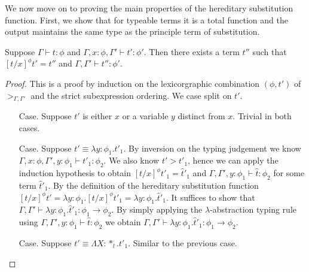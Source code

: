 We now move on to proving the main properties of the hereditary
substitution function.  First, we show that for typeable terms it is a
total function and the output maintains the same type as the principle
term of substitution.
\begin{lemma}
  \label{lemma:total_ssfp}
  Suppose $\Gamma \vdash t : \phi$ and $\Gamma, x:\phi, \Gamma' \vdash t':\phi'$. Then
  there exists a term $t''$ such that $[t/x]^\phi t' = t''$ and 
  $\Gamma,\Gamma' \vdash t'':\phi'$.
\end{lemma}
\begin{proof}
  This is a proof by induction on the lexicorgraphic combination $(\phi, t')$ of $>_{\Gamma,\Gamma'}$ and
the strict subexpression ordering.  We case split on $t'$.

\begin{itemize}
\item[Case.] Suppose $t'$ is either $x$ or a variable $y$ distinct from $x$.  
  Trivial in both cases.
  
\item[Case.] Suppose $t' \equiv \lambda y:\phi_1.t'_1$.  By inversion on the
  typing judgement we know $\Gamma,x:\phi,\Gamma',y:\phi_1 \vdash t'_1:\phi_2$.
  We also know $t' > t'_1$, hence we can apply the induction hypothesis to obtain
  $[t/x]^\phi t'_1 = \hat{t}'_1$ and $\Gamma,\Gamma',y:\phi_1 \vdash \hat{t}:\phi_2$
  for some term $\hat{t}'_1$.  By the definition of the hereditary substitution function 
  $[t/x]^\phi t' = \lambda y:\phi_1.[t/x]^\phi t'_1 = \lambda y:\phi_1.\hat{t}'_1$.  It suffices
  to show that $\Gamma,\Gamma' \vdash \lambda y:\phi_1.\hat{t}'_1:\phi_1 \to \phi_2$.  
  By simply applying the $\lambda$-abstraction typing rule using
  $\Gamma,\Gamma',y:\phi_1 \vdash \hat{t}:\phi_2$ we obtain 
  $\Gamma,\Gamma' \vdash \lambda y:\phi_1.\hat{t}'_1:\phi_1 \to \phi_2$.
  
\item[Case.] Suppose $t' \equiv \Lambda X:*_l.t'_1$.  Similar to the previous case.
  

\end{itemize}
\end{proof}
